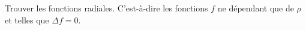 
\begin{exercice}\label{exoOutilsMath-0082}

    Trouver les fonctions  radiales. C'est-à-dire les fonctions $f$ ne dépendant que de $\rho$ et telles que $\Delta f=0$.

\end{exercice}
